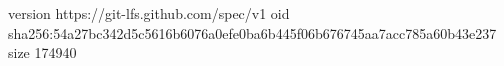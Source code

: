 version https://git-lfs.github.com/spec/v1
oid sha256:54a27bc342d5c5616b6076a0efe0ba6b445f06b676745aa7acc785a60b43e237
size 174940
